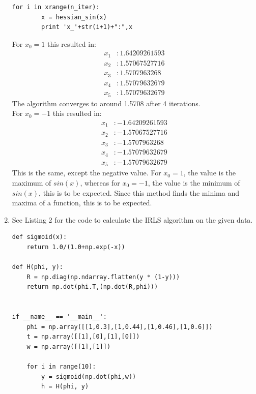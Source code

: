 \documentclass[a4paper,10pt]{article}
\numberwithin{equation}{section} %
\numberwithin{figure}{section} %
\numberwithin{table}{section} %
\theoremstyle{mytheor}
\begin{document}
\begin{enumerate}
\begin{lstlisting}[label={list:first},caption=Python code for function \textit{hessian\_sin(x)} and \textit{run\_hessian\_sin(x, n\_iter=5)}.]
    for i in xrange(n_iter):
        x = hessian_sin(x)
        print 'x_'+str(i+1)+":",x
    		\end{lstlisting}
		For $x_0 = 1$ this resulted in:
		\begin{align*}
		x_1&: 1.64209261593\\
		x_2&: 1.57067527716\\
		x_3&: 1.5707963268\\
		x_4&: 1.57079632679\\
		x_5&: 1.57079632679
		\end{align*}
		The algorithm converges to around 1.5708 after 4 iterations.\\
		For $x_0 = -1$ this resulted in: 
		\begin{align*}
		x_1&: -1.64209261593\\
		x_2&: -1.57067527716\\
		x_3&: -1.5707963268\\
		x_4&: -1.57079632679\\
		x_5&: -1.57079632679
		\end{align*}
		This is the same, except the negative value. For $x_0 = 1$, the value is the maximum of $sin(x)$, whereas for $x_0 = -1$, the value is the minimum of $sin(x)$, this is to be expected. Since this method finds the minima and maxima of a function, this is to be expected. 
	\item See Listing 2 for the code to calculate the IRLS algorithm on the given data. \begin{lstlisting}[label={list:first},caption=Python code for function \textit{sigmoid(x)} and \textit{H(phi, y)} and the $main$.]
def sigmoid(x):
    return 1.0/(1.0+np.exp(-x))
    
def H(phi, y):
    R = np.diag(np.ndarray.flatten(y * (1-y)))
    return np.dot(phi.T,(np.dot(R,phi)))


if __name__ == '__main__':
    phi = np.array([[1,0.3],[1,0.44],[1,0.46],[1,0.6]])
    t = np.array([[1],[0],[1],[0]])
    w = np.array([[1],[1]])
    
    for i in range(10):
        y = sigmoid(np.dot(phi,w))
        h = H(phi, y)
        

\end{lstlisting}
\end{enumerate}
\end{document}
